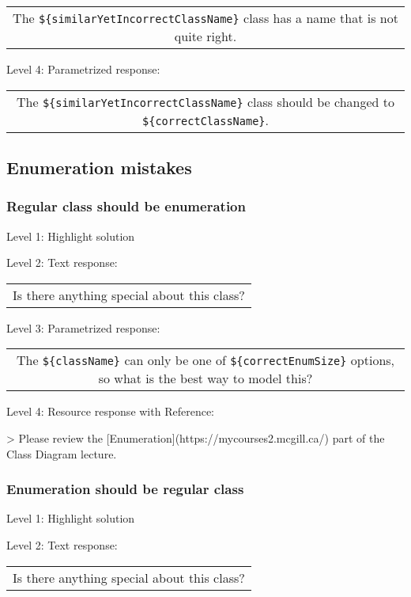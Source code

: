 \begin{tabular}{|c}
The \verb|${similarYetIncorrectClassName}| class has a name that is not quite right.
\end{tabular} \medskip

\noindent Level 4: Parametrized response: \medskip

\begin{tabular}{|c}
The \verb|${similarYetIncorrectClassName}| class should be changed to \verb|${correctClassName}|.
\end{tabular} \medskip


\subsection{Enumeration mistakes}

\subsubsection{Regular class should be enumeration}

\noindent Level 1: Highlight solution \medskip

\noindent Level 2: Text response: \medskip

\begin{tabular}{|c}
Is there anything special about this class?
\end{tabular} \medskip

\noindent Level 3: Parametrized response: \medskip

\begin{tabular}{|c}
The \verb|${className}| can only be one of \verb|${correctEnumSize}| options, so what is the best way to model this?
\end{tabular} \medskip

\noindent Level 4: Resource response with Reference:

> Please review the [Enumeration](https://mycourses2.mcgill.ca/) part of the Class Diagram lecture.


\subsubsection{Enumeration should be regular class}

\noindent Level 1: Highlight solution \medskip

\noindent Level 2: Text response: \medskip

\begin{tabular}{|c}
Is there anything special about this class?
\end{tabular} \medskip


